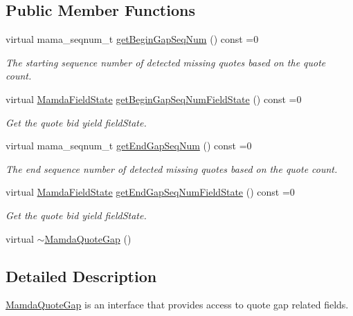 \subsection*{Public Member Functions}
\begin{CompactItemize}
\item 
virtual mama\_\-seqnum\_\-t \hyperlink{classWombat_1_1MamdaQuoteGap_f87125caab3a18c6dde0b5dc5e13f35a}{get\-Begin\-Gap\-Seq\-Num} () const =0
\begin{CompactList}\small\item\em The starting sequence number of detected missing quotes based on the quote count. \item\end{CompactList}\item 
virtual \hyperlink{namespaceWombat_93aac974f2ab713554fd12a1fa3b7d2a}{Mamda\-Field\-State} \hyperlink{classWombat_1_1MamdaQuoteGap_3fef0c397fa74bb7bdd1102002869012}{get\-Begin\-Gap\-Seq\-Num\-Field\-State} () const =0
\begin{CompactList}\small\item\em Get the quote bid yield field\-State. \item\end{CompactList}\item 
virtual mama\_\-seqnum\_\-t \hyperlink{classWombat_1_1MamdaQuoteGap_167d4cb258854b3665a5a7624824103d}{get\-End\-Gap\-Seq\-Num} () const =0
\begin{CompactList}\small\item\em The end sequence number of detected missing quotes based on the quote count. \item\end{CompactList}\item 
virtual \hyperlink{namespaceWombat_93aac974f2ab713554fd12a1fa3b7d2a}{Mamda\-Field\-State} \hyperlink{classWombat_1_1MamdaQuoteGap_79a42883fe6a8fcb0832fab98202b912}{get\-End\-Gap\-Seq\-Num\-Field\-State} () const =0
\begin{CompactList}\small\item\em Get the quote bid yield field\-State. \item\end{CompactList}\item 
virtual \hyperlink{classWombat_1_1MamdaQuoteGap_08782dae0fa806679f0d2789e0bd27ff}{$\sim$Mamda\-Quote\-Gap} ()
\end{CompactItemize}


\subsection{Detailed Description}
\hyperlink{classWombat_1_1MamdaQuoteGap}{Mamda\-Quote\-Gap} is an interface that provides access to quote gap related fields. 



